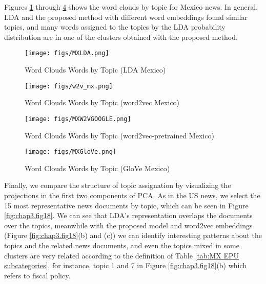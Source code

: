 \documentclass{article}
\begin{document}
Figures \ref{fig:chap3.fig12} through \ref{fig:chap3.fig14} shows the word clouds by topic for Mexico news. In general, LDA and the proposed method with different word embeddings found similar topics, and many words assigned to the topics by the LDA probability distribution are in one of the clusters obtained with the proposed method.
 
\begin{figure}[H]
  \centering
  \texttt{[image: figs/MXLDA.png]}
  \caption{Word Clouds Words by Topic (LDA Mexico) }
  \label{fig:chap3.fig12}
\end{figure}

\begin{figure}[H]
  \centering
  \texttt{[image: figs/w2v\_mx.png]}
  \caption{Word Clouds Words by Topic (word2vec Mexico) }
  \label{fig:chap3.fig12a}
\end{figure}

\begin{figure}[H]
  \centering
  \texttt{[image: figs/MXW2VGOOGLE.png]}
  \caption{Word Clouds Words by Topic (word2vec-pretrained Mexico)}
  \label{fig:chap3.fig13}
\end{figure}

\begin{figure}[H]
  \centering
  \texttt{[image: figs/MXGloVe.png]}
  \caption{Word Clouds Words by Topic (GloVe Mexico)}
  \label{fig:chap3.fig14}
\end{figure}


Finally, we compare the structure of topic assignation by visualizing the projections in the first two components of PCA. As in the US news, we select the 15 most representative news documents by topic, which can be seen in Figure \ref{fig:chap3.fig18}. We can see that LDA's representation overlaps  the documents over the topics, meanwhile with the proposed model and word2vec embeddings (Figure \ref{fig:chap3.fig18}(b) and (c)) we can identify interesting patterns about the topics and the related news documents, and even the topics mixed in some clusters are very related according to the definition of Table \ref{tab:MX EPU subcategories}, for instance, topic 1 and 7 in Figure \ref{fig:chap3.fig18}(b) which refers to fiscal policy. 
\end{document}
